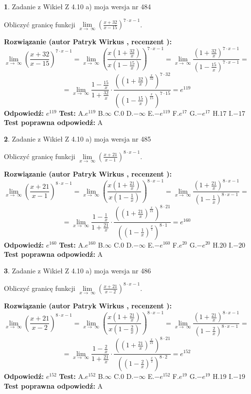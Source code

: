 \documentclass[12pt, a4paper]{article}
\theoremstyle{definition} %
\newtheorem{zad}{}
\newcommand{\zadStart}[1]{\begin{zad}#1\newline}
\newcommand{\zadStop}{\end{zad}}
\newcommand{\rozwStart}[2]{\noindent \textbf{Rozwiązanie (autor #1 , recenzent #2): }\newline}
\newcommand{\rozwStop}{\newline}
\newcommand{\odpStart}{\noindent \textbf{Odpowiedź:}\newline}
\newcommand{\odpStop}{\newline}
\newcommand{\testStart}{\noindent \textbf{Test:}\newline}
\newcommand{\testStop}{\newline}
\newcommand{\kluczStart}{\noindent \textbf{Test poprawna odpowiedź:}\newline}
\newcommand{\kluczStop}{\newline}
\begin{document}
\zadStart{Zadanie z Wikieł Z 4.10 a) moja wersja nr 484}

Obliczyć granicę funkcji  $\lim\limits_{x\to\ \infty}(\frac{x+32}{x-15})^{7\cdot x-1}$.
\zadStop
\rozwStart{Patryk Wirkus}{}
$$\lim\limits_{x\to\ \infty}(\frac{x+32}{x-15})^{7\cdot x-1} = \lim\limits_{x\to\ \infty}(\frac{x(1+\frac{32}{x})}{x(1-\frac{15}{x})})^{7\cdot x-1}=\lim\limits_{x\to\ \infty}\frac{(1+\frac{32}{x})^{7\cdot x-1}}{(1-\frac{15}{x})^{7\cdot x-1}}=$$
$$=\lim\limits_{x\to\ \infty}\frac{1-\frac{15}{x}}{1+\frac{32}{x}}\cdot\frac{((1+\frac{32}{x})^{\frac{x}{32}})^{7\cdot32}}{((1-\frac{15}{x})^{\frac{x}{15}})^{7\cdot15}}=e^{119}$$
\rozwStop
\odpStart
$e^{119}$
\odpStop
\testStart
A.$e^{119}$ B.$\infty$ C.$0$ D.$-\infty$ E.$-e^{119}$
F.$e^{17}$ G.$-e^{17}$
H.$17$
I.$-17$
\testStop
\kluczStart
A
\kluczStop



\zadStart{Zadanie z Wikieł Z 4.10 a) moja wersja nr 485}

Obliczyć granicę funkcji  $\lim\limits_{x\to\ \infty}(\frac{x+21}{x-1})^{8\cdot x-1}$.
\zadStop
\rozwStart{Patryk Wirkus}{}
$$\lim\limits_{x\to\ \infty}(\frac{x+21}{x-1})^{8\cdot x-1} = \lim\limits_{x\to\ \infty}(\frac{x(1+\frac{21}{x})}{x(1-\frac{1}{x})})^{8\cdot x-1}=\lim\limits_{x\to\ \infty}\frac{(1+\frac{21}{x})^{8\cdot x-1}}{(1-\frac{1}{x})^{8\cdot x-1}}=$$
$$=\lim\limits_{x\to\ \infty}\frac{1-\frac{1}{x}}{1+\frac{21}{x}}\cdot\frac{((1+\frac{21}{x})^{\frac{x}{21}})^{8\cdot21}}{((1-\frac{1}{x})^{\frac{x}{1}})^{8\cdot1}}=e^{160}$$
\rozwStop
\odpStart
$e^{160}$
\odpStop
\testStart
A.$e^{160}$ B.$\infty$ C.$0$ D.$-\infty$ E.$-e^{160}$
F.$e^{20}$ G.$-e^{20}$
H.$20$
I.$-20$
\testStop
\kluczStart
A
\kluczStop



\zadStart{Zadanie z Wikieł Z 4.10 a) moja wersja nr 486}

Obliczyć granicę funkcji  $\lim\limits_{x\to\ \infty}(\frac{x+21}{x-2})^{8\cdot x-1}$.
\zadStop
\rozwStart{Patryk Wirkus}{}
$$\lim\limits_{x\to\ \infty}(\frac{x+21}{x-2})^{8\cdot x-1} = \lim\limits_{x\to\ \infty}(\frac{x(1+\frac{21}{x})}{x(1-\frac{2}{x})})^{8\cdot x-1}=\lim\limits_{x\to\ \infty}\frac{(1+\frac{21}{x})^{8\cdot x-1}}{(1-\frac{2}{x})^{8\cdot x-1}}=$$
$$=\lim\limits_{x\to\ \infty}\frac{1-\frac{2}{x}}{1+\frac{21}{x}}\cdot\frac{((1+\frac{21}{x})^{\frac{x}{21}})^{8\cdot21}}{((1-\frac{2}{x})^{\frac{x}{2}})^{8\cdot2}}=e^{152}$$
\rozwStop
\odpStart
$e^{152}$
\odpStop
\testStart
A.$e^{152}$ B.$\infty$ C.$0$ D.$-\infty$ E.$-e^{152}$
F.$e^{19}$ G.$-e^{19}$
H.$19$
I.$-19$
\testStop
\kluczStart
A
\kluczStop
\end{document}
